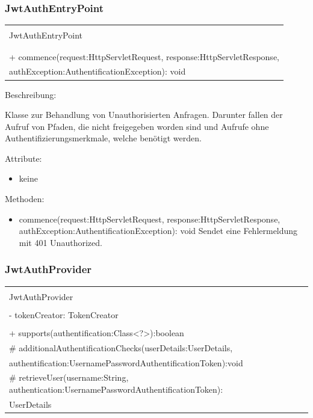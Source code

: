 \documentclass[a4paper,20pt,oneside]{book}
\begin{document}
	\subsubsection{JwtAuthEntryPoint}
	\centering
	\begin{tabular}{|l|}
	\hline \\
	JwtAuthEntryPoint \\ \hline \\
	\hline \\
	+ commence(request:HttpServletRequest, response:HttpServletResponse,\\ authException:AuthentificationException): void
 \\ \hline
	\end{tabular}
	 
	\vspace{0.5cm}
	\raggedright
	Beschreibung:
	
	Klasse zur Behandlung von Unauthorisierten Anfragen. Darunter fallen der Aufruf von Pfaden, die nicht freigegeben worden sind und Aufrufe ohne Authentifizierungsmerkmale, welche benötigt werden.
	
	\vspace{0.5cm}
	Attribute:
	\begin{itemize}
	\item keine
	\end{itemize}
	
	Methoden:
	\begin{itemize}
	\item commence(request:HttpServletRequest, response:HttpServletResponse,\\ authException:AuthentificationException): void\linebreak
	Sendet eine Fehlermeldung mit 401 Unauthorized.
	\end{itemize}
	
	\subsubsection{JwtAuthProvider}
\centering
	\begin{tabular}{|l|}
	\hline \\
	JwtAuthProvider \\ \hline \\
	- tokenCreator: TokenCreator\\
	 \hline \\
	+ supports(authentification:Class<?>):boolean\\
	\# additionalAuthentificationChecks(userDetails:UserDetails,\\ authentification:UsernamePasswordAuthentificationToken):void\\
	\# retrieveUser(username:String, authentication:UsernamePasswordAuthentificationToken):\\UserDetails
	\\ 
	 \hline
	\end{tabular}
		 
\end{document}
